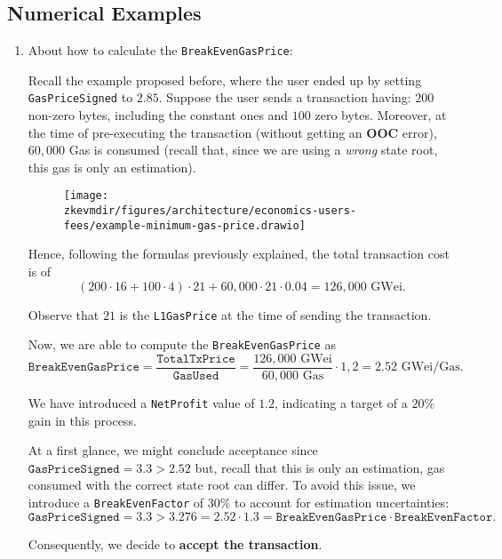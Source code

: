\subsection{Numerical Examples}

\begin{enumerate}

\item About how to calculate the \texttt{BreakEvenGasPrice}:

Recall the example proposed before, where the user ended up by setting \texttt{GasPriceSigned} to $2.85$. Suppose the user sends a transaction having: $200$ non-zero bytes, including the constant ones and $100$ zero bytes. Moreover, at the time of pre-executing the transaction (without getting an \textbf{OOC} error), $60,000$ Gas is consumed (recall that, since we are using a \textit{wrong} state root, this gas is only an estimation).

\begin{figure}[H]
\centering
\texttt{[image: \\zkevmdir/figures/architecture/economics-users-fees/example-minimum-gas-price.drawio]}
\end{figure}

Hence, following the formulas previously explained, the total transaction cost is of
\[
\left( 200 \cdot 16 + 100 \cdot 4 \right) \cdot 21 + 60,000 \cdot 21 \cdot 0.04 = 126,000 \text{ GWei}.
\]

Observe that $21$ is the \texttt{L1GasPrice} at the time of sending the transaction.

Now, we are able to compute the \texttt{BreakEvenGasPrice} as
\[
\texttt{BreakEvenGasPrice} = \frac{\texttt{TotalTxPrice}}{\texttt{GasUsed}} = \frac{126,000 \text{ GWei}}{60,000 \text{ Gas}} \cdot 1,2 = 2.52 \text{ GWei/Gas}.
\]

We have introduced a \texttt{NetProfit} value of $1.2$, indicating a target of a $20\%$ gain in this process.

At a first glance, we might conclude acceptance since $\texttt{GasPriceSigned} = 3.3 > 2.52$ but, recall that this is only an estimation, gas consumed with the correct state root can differ. To avoid this issue, we introduce a \texttt{BreakEvenFactor} of $30\%$ to account for estimation uncertainties:
\[
\texttt{GasPriceSigned} = 3.3 > 3.276 = 2.52 \cdot 1.3 = \texttt{BreakEvenGasPrice} \cdot \texttt{BreakEvenFactor}.
\]

Consequently, we decide to \textbf{accept the transaction}.




\end{enumerate}
